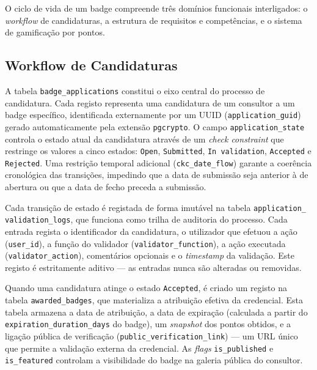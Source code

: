 \documentclass[12pt,a4paper]{report}
\begin{document}
O ciclo de vida de um badge compreende três domínios funcionais interligados: o \textit{workflow} de candidaturas, a estrutura de requisitos e competências, e o sistema de gamificação por pontos.

\subsection{Workflow de Candidaturas}
\label{subsec:db-applications}

A tabela \texttt{badge\_applications} constitui o eixo central do processo de candidatura. Cada registo representa uma candidatura de um consultor a um badge específico, identificada externamente por um UUID (\texttt{application\_guid}) gerado automaticamente pela extensão \texttt{pgcrypto}. O campo \texttt{application\_state} controla o estado atual da candidatura através de um \textit{check constraint} que restringe os valores a cinco estados: \texttt{Open}, \texttt{Submitted}, \texttt{In validation}, \texttt{Accepted} e \texttt{Rejected}. Uma restrição temporal adicional (\texttt{ckc\_date\_flow}) garante a coerência cronológica das transições, impedindo que a data de submissão seja anterior à de abertura ou que a data de fecho preceda a submissão.

Cada transição de estado é registada de forma imutável na tabela \texttt{application\_ validation\_logs}, que funciona como trilha de auditoria do processo. Cada entrada regista o identificador da candidatura, o utilizador que efetuou a ação (\texttt{user\_id}), a função do validador (\texttt{validator\_\allowbreak function}), a ação executada (\texttt{validator\_\allowbreak action}), comentários opcionais e o \textit{timestamp} da validação. Este registo é estritamente aditivo --- as entradas nunca são alteradas ou removidas.

Quando uma candidatura atinge o estado \texttt{Accepted}, é criado um registo na tabela \texttt{awarded\_\allowbreak badges}, que materializa a atribuição efetiva da credencial. Esta tabela armazena a data de atribuição, a data de expiração (calculada a partir do \texttt{expiration\_\allowbreak duration\_\allowbreak days} do badge), um \textit{snapshot} dos pontos obtidos, e a ligação pública de verificação (\texttt{public\_\allowbreak verification\_\allowbreak link}) --- um URL único que permite a validação externa da credencial. As \textit{flags} \texttt{is\_published} e \texttt{is\_featured} controlam a visibilidade do badge na galeria pública do consultor.
\end{document}
